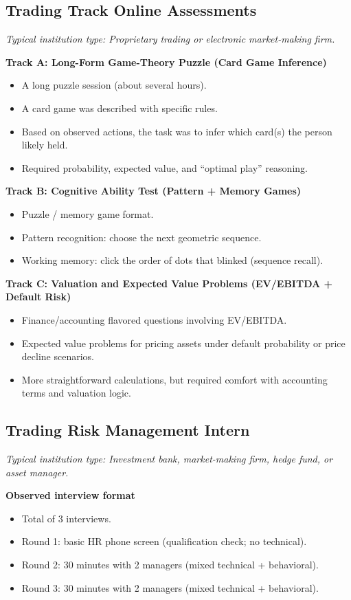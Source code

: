 \documentclass[11pt,letterpaper,openany]{book}
\newcommand{\RoleProfile}[2]{%
  \subsection{#1}%
  \noindent\textit{Typical institution type: #2.}\par
}
\begin{document}
\RoleProfile{Trading Track Online Assessments}{Proprietary trading or electronic market-making firm}
\textbf{Track A: Long-Form Game-Theory Puzzle (Card Game Inference)}
\begin{itemize}
  \item A long puzzle session (about several hours).
  \item A card game was described with specific rules.
  \item Based on observed actions, the task was to infer which card(s) the person likely held.
  \item Required probability, expected value, and ``optimal play'' reasoning.
\end{itemize}

\textbf{Track B: Cognitive Ability Test (Pattern + Memory Games)}
\begin{itemize}
  \item Puzzle / memory game format.
  \item Pattern recognition: choose the next geometric sequence.
  \item Working memory: click the order of dots that blinked (sequence recall).
\end{itemize}

\textbf{Track C: Valuation and Expected Value Problems (EV/EBITDA + Default Risk)}
\begin{itemize}
  \item Finance/accounting flavored questions involving EV/EBITDA.
  \item Expected value problems for pricing assets under default probability or price decline scenarios.
  \item More straightforward calculations, but required comfort with accounting terms and valuation logic.
\end{itemize}

\RoleProfile{Trading Risk Management Intern}{Investment bank, market-making firm, hedge fund, or asset manager}
\textbf{Observed interview format}
\begin{itemize}
  \item Total of 3 interviews.
  \item Round 1: basic HR phone screen (qualification check; no technical).
  \item Round 2: 30 minutes with 2 managers (mixed technical + behavioral).
  \item Round 3: 30 minutes with 2 managers (mixed technical + behavioral).
\end{itemize}
\end{document}
